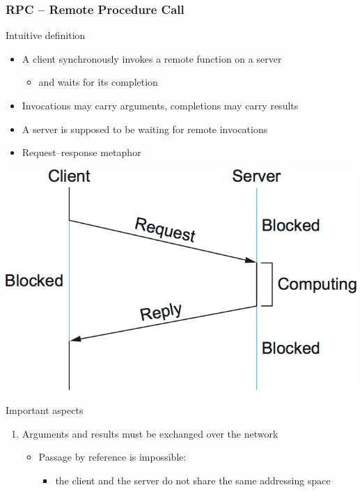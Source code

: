 \documentclass[presentation]{beamer}\mode<presentation>{\usetheme{AMSBolognaFC}}
\begin{document}
\begin{frame}[allowframebreaks]
    \frametitle{RPC -- Remote Procedure Call}

    \begin{block}{Intuitive definition}
        \begin{itemize}
            \item A client synchronously invokes a remote function on a server
            \begin{itemize}
                \item and waits for its completion
            \end{itemize}

            \item Invocations may carry arguments, completions may carry results

            \item A server is supposed to be waiting for remote invocations

            \item Request--response metaphor
        \end{itemize}
    \end{block}

    \centering

    \includegraphics[width=.8\linewidth]{figures/rpc.png}

    \framebreak

    \begin{alertblock}{Important aspects}
        \begin{enumerate}
            \item Arguments and results must be exchanged over the network
            \begin{itemize}
                \item Passage by reference is impossible:
                \begin{itemize}
                    \item the client and the server do not share the same addressing space
                \end{itemize}


\end{itemize}
\end{enumerate}
\end{alertblock}
\end{frame}
\end{document}
